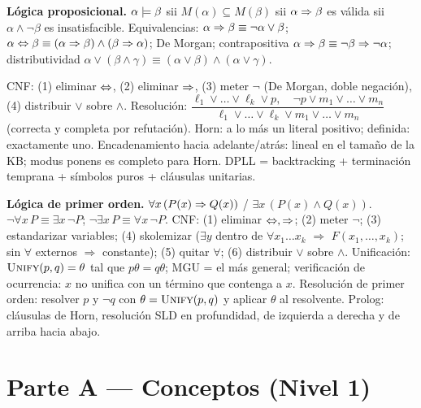 \begin{formulario}
\textbf{Lógica proposicional.} $\alpha\models\beta$ sii $M(\alpha)\subseteq M(\beta)$
sii $\alpha\Rightarrow\beta$ es válida sii $\alpha\wedge\neg\beta$ es insatisfacible.
Equivalencias: $\alpha\Rightarrow\beta\equiv\neg\alpha\vee\beta$;
$\alpha\Leftrightarrow\beta\equiv(\alpha\Rightarrow\beta)\wedge(\beta\Rightarrow\alpha)$;
De Morgan; contrapositiva $\alpha\Rightarrow\beta\equiv\neg\beta\Rightarrow\neg\alpha$;
distributividad $\alpha\vee(\beta\wedge\gamma)\equiv(\alpha\vee\beta)\wedge(\alpha\vee\gamma)$.

CNF: (1) eliminar $\Leftrightarrow$, (2) eliminar $\Rightarrow$, (3) meter $\neg$ (De Morgan, doble negación),
(4) distribuir $\vee$ sobre $\wedge$.
Resolución: $\dfrac{\ell_1\vee\dots\vee\ell_k\vee p,\quad \neg p\vee m_1\vee\dots\vee m_n}{\ell_1\vee\dots\vee\ell_k\vee m_1\vee\dots\vee m_n}$
(correcta y completa por refutación).
Horn: a lo más un literal positivo; definida: exactamente uno. Encadenamiento
hacia adelante/atrás: lineal en el tamaño de la KB; modus ponens es completo para Horn.
DPLL = backtracking + terminación temprana + símbolos puros + cláusulas unitarias.
\end{formulario}

\begin{formulario}
\textbf{Lógica de primer orden.} $\forall x\,(P(x)\Rightarrow Q(x))$ \;/\; $\exists x\,(P(x)\wedge Q(x))$.
$\neg\forall x\,P\equiv\exists x\,\neg P$; $\neg\exists x\,P\equiv\forall x\,\neg P$.
CNF: (1) eliminar $\Leftrightarrow,\Rightarrow$; (2) meter $\neg$; (3) estandarizar variables; (4) skolemizar
($\exists y$ dentro de $\forall x_1\dots x_k$ $\Rightarrow$ $F(x_1,\dots,x_k)$; sin $\forall$ externos
$\Rightarrow$ constante); (5) quitar $\forall$; (6) distribuir $\vee$ sobre $\wedge$.
Unificación: $\textsc{Unify}(p,q)=\theta$ tal que $p\theta=q\theta$; MGU = el más general;
verificación de ocurrencia: $x$ no unifica con un término que contenga a $x$.
Resolución de primer orden: resolver $p$ y $\neg q$ con $\theta=\textsc{Unify}(p,q)$ y aplicar
$\theta$ al resolvente. Prolog: cláusulas de Horn, resolución SLD en profundidad, de izquierda a
derecha y de arriba hacia abajo.
\end{formulario}

\newpage
\section{Parte A — Conceptos (Nivel 1)}

